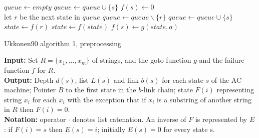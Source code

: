 \documentclass[english,twoside,censored,csm,algorithms-track-2020]{HYthesisML}
\theoremstyle{plain}
\theoremstyle{definition}
\begin{document}
\begin{lemma}[]
\begin{algorithm}
    \begin{algorithmic}[1]
        \State $queue\gets \textit{empty}$
          \State $queue\gets queue \cup \{s\}$
          \State $f(s)\gets 0$
        \EndFor
        \\
          \hspace*{\algorithmicindent}let $r$ be the next state in $queue$
          \State $queue\gets queue \backslash \{r\}$
            \State $queue\gets queue \cup \{s\}$
            \State $state\gets f(r)$
              \State $state\gets f(state)$
            \EndWhile
            \State $f(s)\gets g(state,a)$              
          \EndFor
        \EndWhile
          
      \EndFunction

    \end{algorithmic}
  \end{algorithm}


  \begin{algorithm}

    \caption{Ukkonen90 algorithm 1, preprocessing} \label{ukk-pre}
    \hspace*{\algorithmicindent} \textbf{Input:} Set $R=\{x_1,...,x_m\}$ of strings, and the goto function $g$ and the failure function $f$ for $R$.\\
    \hspace*{\algorithmicindent} \textbf{Output:} Depth $d(s)$, list $L(s)$ and link $b(s)$ for each state $s$ of the AC machine; Pointer $B$ to the first state in the $b$-link chain; state $F(i)$ representing string $x_i$ for each $x_i$ with the exception that if $x_i$ is a substring of another string in $R$ then $F(i) = 0$.\\
    \hspace*{\algorithmicindent} \textbf{Notation:} operator $\cdot$ denotes list catenation. An inverse of $F$ is represented by $E$: if $F(i) = s$ then $E(s) = i$; initially $E(s) = 0$ for every state s.\\
    

\end{algorithm}
\end{lemma}
\end{document}
